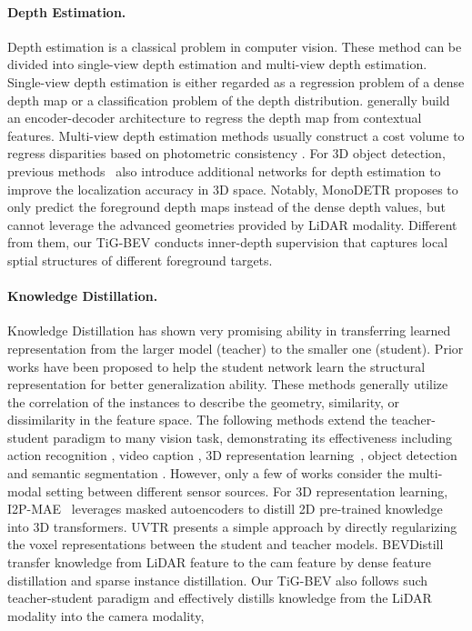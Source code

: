 \paragraph{Depth Estimation.} Depth estimation is a classical problem in computer vision. These method can be divided into single-view depth estimation and multi-view depth estimation. Single-view depth estimation is either regarded as a regression problem of a dense depth map or a classification problem of the depth distribution. \cite{b26, b27, b28, b29, b30} generally build an encoder-decoder architecture to regress the depth map from contextual features. Multi-view depth estimation methods usually construct a cost volume to regress disparities based on photometric consistency \cite{b31, b32, b33, b34, b35, b62}. For 3D object detection, previous methods~\cite{b61,b51,b52} also introduce additional networks for depth estimation to improve the localization accuracy in 3D space.
Notably, MonoDETR \cite{b47,b48} proposes to only predict the foreground depth maps instead of the dense depth values, but cannot leverage the advanced geometries provided by LiDAR modality. Different from them, our TiG-BEV conducts inner-depth supervision that captures local sptial structures of different foreground targets.

\paragraph{Knowledge Distillation.} Knowledge Distillation has shown very promising ability in transferring learned representation from the larger model (teacher) to the smaller one (student). Prior works \cite{b37, b38, b39, b40} have been proposed to help the student network learn the structural representation for better generalization ability. These methods generally utilize the correlation of the instances to describe the geometry, similarity, or dissimilarity in the feature space. The following methods extend the teacher-student paradigm to many vision task, demonstrating its effectiveness including action recognition \cite{b41}, video caption \cite{b42}, 3D representation learning~\cite{b59,b49,b50,b60}, object detection \cite{b43, b44} and semantic segmentation \cite{b45, b46}. However, only a few of works consider the multi-modal setting between different sensor sources. For 3D representation learning, I2P-MAE~\cite{b49} leverages masked autoencoders to distill 2D pre-trained knowledge into 3D transformers. UVTR \cite{b25} presents a simple approach by directly regularizing the voxel representations between the student and teacher models. BEVDistill \cite{b9} transfer knowledge from LiDAR feature to the cam feature by dense feature distillation and sparse instance distillation. Our TiG-BEV also follows such teacher-student paradigm and effectively distills knowledge from the LiDAR modality into the camera modality,


